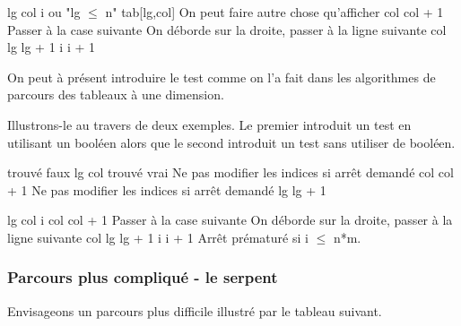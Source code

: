 \begin{Pseudocode}
	\Let lg 
	\Let col 
	\Let i 
	 \RComment ou "lg $\le$ n" 
		\Write tab[lg,col] \RComment On peut faire autre chose qu'afficher
		\Let col \Gets col + 1	\RComment Passer à la case suivante
		 \RComment On déborde sur la droite, passer à la ligne suivante
			\Let col 
			\Let lg \Gets lg + 1
		\EndIf
		\Let i \Gets i + 1		
	\EndWhile
\end{Pseudocode}

On peut à présent introduire le test comme on l'a fait 
dans les algorithmes de parcours des tableaux à une dimension.

Illustrons-le au travers de deux exemples.
Le premier introduit un test en utilisant un booléen
alors que le second introduit un test
sans utiliser de booléen.

\begin{Pseudocode}
	\Let trouvé \Gets faux
	\Let lg 
		\Let col 
				\Let trouvé \Gets vrai
			\Else \RComment Ne pas modifier les indices si arrêt demandé
				\Let col \Gets col + 1
			\EndIf
		\EndWhile
		 \RComment Ne pas modifier les indices si arrêt demandé
			\Let lg \Gets lg + 1
		\EndIf
	\EndWhile
\end{Pseudocode}

\begin{Pseudocode}
	\Let lg 
	\Let col 
	\Let i 
		\Let col \Gets col + 1	\RComment Passer à la case suivante
		 \RComment On déborde sur la droite, passer à la ligne suivante
			\Let col 
			\Let lg \Gets lg + 1
		\EndIf
		\Let i \Gets i + 1		
	\EndWhile
	\LComment Arrêt prématuré si i $\le$ n*m.
\end{Pseudocode}

\subsubsection*{Parcours plus compliqué - le serpent}

Envisageons un parcours plus difficile illustré par le tableau suivant.


